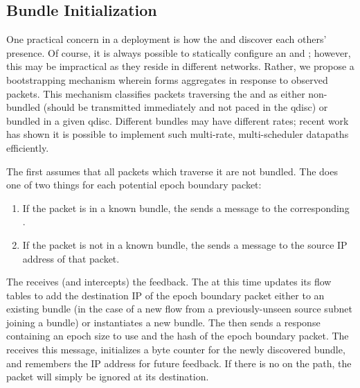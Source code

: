  

\subsection{Bundle Initialization}\label{s:impl:discovery}

One practical concern in a \name deployment is how the \inbox and \outbox discover each others' presence. Of course, it is always possible to statically configure an \inbox and \outbox; however, this may be impractical as they reside in different networks.
Rather, we propose a bootstrapping mechanism wherein \name forms aggregates in response to observed packets.
This mechanism classifies packets traversing the \inbox and \outbox as either non-bundled (should be transmitted immediately and not paced in the qdisc) or bundled in a given qdisc. Different bundles may have different rates; recent work~\cite{carousel, eifel} has shown it is possible to implement such multi-rate, multi-scheduler datapaths efficiently.

The \inbox first assumes that all packets which traverse it are not bundled.
The \outbox does one of two things for each potential epoch boundary packet:
\begin{enumerate}
    \item If the packet is in a known bundle, the \outbox sends a message to the corresponding \inbox.
    \item If the packet is not in a known bundle, the \outbox sends a message to the source IP address of that packet.
\end{enumerate}

The \inbox receives (and intercepts) the \outbox feedback.  
The \inbox at this time updates its flow tables to add the destination IP of the epoch boundary packet either to an existing bundle (in the case of a new flow from a previously-unseen source subnet joining a bundle) or instantiates a new bundle.
The \inbox then sends a response containing an epoch size to use and the hash of the epoch boundary packet.
The \outbox receives this message, initializes a byte counter for the newly discovered bundle, and remembers the \inbox IP address for future feedback. If there is no \inbox on the path, the packet will simply be ignored at its destination. 


